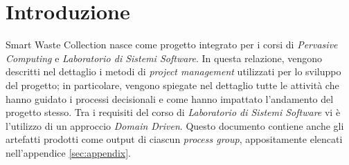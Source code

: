 \section*{Introduzione}
\label{sec:introduction}

Smart Waste Collection nasce come progetto integrato per i corsi di \textit{Pervasive Computing} e \textit{Laboratorio di
Sistemi Software}. In questa relazione, vengono descritti nel dettaglio i metodi di \textit{project management} utilizzati
per lo sviluppo del progetto; in particolare, vengono spiegate nel dettaglio tutte le attività che hanno guidato i
processi decisionali e come hanno impattato l'andamento del progetto stesso. Tra i requisiti del corso di \textit{Laboratorio
di Sistemi Software} vi è l'utilizzo di un approccio \textit{Domain Driven}. Questo documento contiene anche gli artefatti
prodotti come output di ciascun \textit{process group}, appositamente elencati nell'appendice \ref{sec:appendix}.